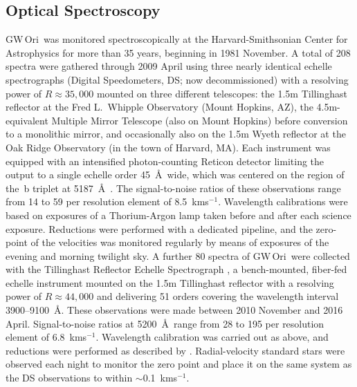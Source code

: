 \documentclass[twocolumn]{aastex6}
\newcommand\kms{\ifmmode{\rm km\thinspace s^{-1}}\else km\thinspace s$^{-1}$\fi}
\newcommand{\gw}{GW\,Ori}
\begin{document}
\subsection{Optical Spectroscopy \label{sec:spectroscopy}}

\gw\ was monitored spectroscopically at the Harvard-Smithsonian Center for Astrophysics for more than 35 years, beginning in 1981 November. A total of 208 spectra were gathered through 2009 April using three nearly identical echelle spectrographs (Digital Speedometers, DS; now decommissioned) with a resolving power of $R \approx 35,000$ mounted on three different telescopes: the 1.5m Tillinghast reflector at the Fred L.\ Whipple Observatory (Mount Hopkins, AZ), the 4.5m-equivalent Multiple Mirror Telescope (also on Mount Hopkins) before conversion to a monolithic mirror, and occasionally also on the 1.5m Wyeth reflector at the Oak Ridge Observatory (in the town of Harvard, MA).  Each instrument was equipped with an intensified photon-counting Reticon detector limiting the output to a single echelle order 45~\AA\ wide, which was centered on the region of the \,b triplet at 5187~\AA\ \citep[see][]{latham92}. The signal-to-noise ratios of these observations range from 14 to 59 per resolution element of 8.5~\kms. Wavelength calibrations were based on exposures of a Thorium-Argon lamp taken before and after each science exposure. Reductions were performed with a dedicated pipeline, and the zero-point of the velocities was monitored regularly by means of exposures of the evening and morning twilight sky. A further 80 spectra of \gw\ were collected with the Tillinghast Reflector Echelle Spectrograph \citep[TRES;][]{furesz08}, a bench-mounted, fiber-fed echelle instrument mounted on the 1.5m Tillinghast reflector with a resolving power of $R \approx 44,000$ and delivering 51 orders covering the wavelength interval 3900--9100~\AA. These observations were made between 2010 November and 2016 April.  Signal-to-noise ratios at 5200~\AA\ range from 28 to 195 per resolution element of 6.8~\kms. Wavelength calibration was carried out as above, and reductions were performed as described by \cite{buchhave10}. Radial-velocity standard stars were observed each night to monitor the zero point and place it on the same system as the DS observations to within $\sim$0.1~\kms.
\end{document}
